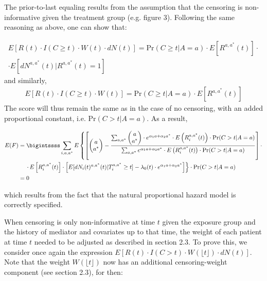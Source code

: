 \documentclass[AMA,STIX1COL]{WileyNJD-v2}
\newcommand{\pr}{\text{Pr}}
\begin{document}
The prior-to-last equaling results from the assumption that the censoring is non-informative given the treatment group (e.g. figure 3). Following the same reasoning as above, one can show that:

\begin{align*}
E[R(t)\cdot I(C\ge t) \cdot W(t)\cdot dN(t)] = \pr(C\ge t|A=a)\cdot E\left[R^{a,a^*}(t)\right]\cdot \\
\cdot E\left[dN^{a,a^*}(t)|R^{a,a^*}(t)=1\right]~~~~~~
\end{align*}
and similarly,
\begin{align*}
E[R(t)\cdot I(C\ge t) \cdot W(t)] = \pr(C\ge t|A=a)\cdot E\left[R^{a,a^*}(t)\right]
\end{align*}
The score will thus remain the same as in the case of no censoring, with an added proportional constant, i.e. $ \pr(C>t|A=a)$. As a result,

\begingroup
\fontsize{10pt}{10pt}\selectfont
\begin{align*}
E(F)&=\bigintssss \sum_{i, a, a^*}  E\left\{\left[\begin{pmatrix} a \\ a^* \end{pmatrix} - \frac{\sum_{a,a^*}\begin{pmatrix} a \\ a^* \end{pmatrix}\cdot e^{\alpha_1a + \alpha_2a^*}\cdot E\left(R_i^{a, a^*}(t)\right)\cdot \pr(C>t|A=a)}{\sum_{a,a^*}e^{\alpha_1a + \alpha_2a^*}\cdot E\left(R_i^{a, a^*}(t)\right)\cdot \pr(C>t|A=a)}\right]\cdot\right.\\
&\,\,\,\,\,\,\,\left.\cdot\, E\left[R_i^{a, a^*}(t)\right]\cdot \left[E[dN_i(t)^{a, a^*} (t)|T_i^{a, a^*} \ge t] - \lambda_0(t)\cdot e^{\alpha_1a+\alpha_2a^*}\right] \right\}\cdot\pr(C>t|A=a)\\
&= 0
\end{align*}
\endgroup

which results from the fact that the natural proportional hazard model is correctly specified. 

When censoring is only non-informative at time $t$ given the exposure group and the history of mediator and covariates up to that time, the weight of each patient at time $t$ needed to be adjusted as described in section 2.3. To prove this, we consider once again the expression $E[R(t)\cdot I(C>t)\cdot W(\lfloor t \rfloor) \cdot dN(t)]$. Note that the weight $W(\lfloor t \rfloor)$ now has an additional censoring-weight component (see section 2.3), for then:
\end{document}
